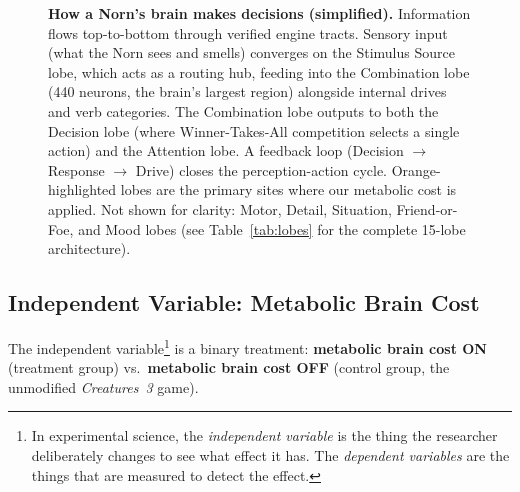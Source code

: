 \documentclass[12pt, a4paper]{article}
\begin{document}
\begin{figure}[htbp]
\caption{\textbf{How a Norn's brain makes decisions (simplified).} Information flows top-to-bottom through verified engine tracts. Sensory input (what the Norn sees and smells) converges on the Stimulus Source lobe, which acts as a routing hub, feeding into the Combination lobe (440 neurons, the brain's largest region) alongside internal drives and verb categories. The Combination lobe outputs to both the Decision lobe (where Winner-Takes-All competition selects a single action) and the Attention lobe. A feedback loop (Decision $\rightarrow$ Response $\rightarrow$ Drive) closes the perception-action cycle. Orange-highlighted lobes are the primary sites where our metabolic cost is applied. Not shown for clarity: Motor, Detail, Situation, Friend-or-Foe, and Mood lobes (see Table~\ref{tab:lobes} for the complete 15-lobe architecture).}
\label{fig:brain-architecture}
\end{figure}

\subsection{Independent Variable: Metabolic Brain Cost}
\label{sec:iv}

The independent variable\footnote{In experimental science, the \emph{independent variable} is the thing the researcher deliberately changes to see what effect it has. The \emph{dependent variables} are the things that are measured to detect the effect.} is a binary treatment: \textbf{metabolic brain cost ON} (treatment group) vs.\ \textbf{metabolic brain cost OFF} (control group, the unmodified \textit{Creatures~3} game).
\end{document}
